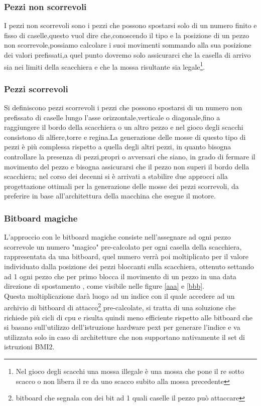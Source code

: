 \subsubsection{Pezzi non scorrevoli}
I pezzi non scorrevoli sono i pezzi che possono spostarsi solo di un numero finito e fisso di caselle,questo vuol dire che,conoscendo il tipo e la posizione di un pezzo non scorrevole,possiamo calcolare i suoi movimenti
sommando alla sua posizione dei valori prefissati,a quel punto dovremo solo assicurarci che la casella di arrivo sia nei limiti della scacchiera e che la mossa risultante sia legale\footnote{Nel gioco degli scacchi una mossa illegale è una mossa che pone il re sotto scacco o non libera il re da uno scacco subito alla mossa precedente}.

\subsubsection{Pezzi  scorrevoli}
Si definiscono pezzi scorrevoli i pezzi che possono spostarsi di un numero non prefissato di caselle lungo l'asse orizzontale,verticale o diagonale,fino a raggiungere il bordo della scacchiera o un altro pezzo
e nel gioco degli scacchi consistono di alfiere,torre e regina.La generazione delle mosse di questo tipo di pezzi è più complessa rispetto a quella degli altri pezzi, in quanto bisogna controllare la presenza di pezzi,propri
o avversari che siano, in grado di fermare il movimento del pezzo e bisogna assicurarsi che il pezzo non superi il bordo della scacchiera;
nel corso  dei decenni si è arrivati a stabilire due approcci alla progettazione ottimali per la generazione delle mosse dei pezzi scorrevoli, 
da preferire in base all'architettura della macchina che esegue il motore.

\subsubsection{Bitboard magiche}
L'approccio con le bitboard magiche consiste nell'assegnare ad ogni pezzo scorrevole un numero "magico" pre-calcolato per ogni casella della scacchiera, rappresentata da una bitboard, quel numero verrà poi moltiplicato
 per il valore individuato dalla posizione dei pezzi bloccanti sulla scacchiera, ottenuto settando ad 1 ogni pezzo che per primo blocca il movimento di un pezzo in una data direzione di spostamento , come 
 visibile nelle  figure \ref{aaa} e \ref{bbb}.\\  
Questa moltiplicazione darà luogo ad un indice con il quale accedere ad un archivio di bitboard di 
attacco\footnote{bitboard che segnala con dei bit ad 1 quali caselle il pezzo può attaccare} pre-calcolate, si tratta di una soluzione che richiede più cicli di cpu e risulta quindi meno efficiente rispetto alle bitboard che si basano sull'utilizzo dell'istruzione hardware pext per generare l'indice
e va utilizzata solo in caso di architetture che non supportano nativamente il set di istruzioni BMI2.


